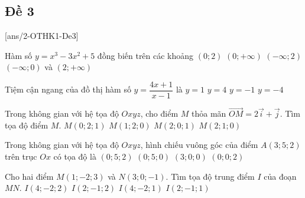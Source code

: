 \subsection{Đề 3}
\caulc
{}[ans/2-OTHK1-De3]
\begin{ex}%
	Hàm số $y=x^{3}-3 x^{2}+5$ đồng biến trên các khoảng
	\choice
	{$(0;2)$}
	{$(0;+\infty)$}
	{$(-\infty;2)$}
	{\True $(-\infty;0)$ và $(2;+\infty)$}
\end{ex}
\begin{ex}%
	Tiệm cận ngang của đồ thị hàm số $y=\dfrac{4x+1}{x-1}$ là
	\choice
	{$y=1$}
	{\True $y=4$}
	{$y=-1$}
	{$y=-4$}
\end{ex}


\begin{ex}%
	Trong không gian với hệ tọa độ $O x y z$, cho điểm $M$ thỏa mãn $\vec{OM} = 2  \vec{i} + \vec{j}$. Tìm tọa độ điểm $M$.
	\choice
	{$M(0;2;1)$}
	{$M(1;2;0)$}
	{$M(2;0;1)$}
	{\True $M(2;1;0)$}
\end{ex}

\begin{ex}%
	Trong không gian với hệ tọa độ $O x y z$, hình chiếu vuông góc của điểm $A(3; 5; 2)$ trên trục $O x$ có tọa độ là
	\choice
	{$(0; 5; 2)$}
	{$(0; 5; 0)$}
	{\True $(3; 0; 0)$}
	{$(0; 0; 2)$}
\end{ex}

\begin{ex}
	Cho hai điểm $M(1;-2; 3)$ và  $N(3;0;-1)$. Tìm tọa độ trung điểm $I$ của đoạn $MN$.
	\choice
	{$I(4;-2;2)$}
	{$I(2;-1;2)$}
	{$I(4;-2;1)$}
	{\True $I(2;-1; 1)$}
\end{ex}

